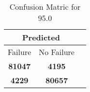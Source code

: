 \begin{table}[] 
\caption{Confusion Matric for 95.0} 
\label{Table: Prediction Accuracy-DMD95.0OnlySunEKF-ignoreReflection10.9EKF-top2-Reflection} 
\centering 
\begin{tabular} 
 {@{}ccc@{}} 
\toprule 
\multicolumn{2}{c}{\textbf{Predicted}}
 \\ \midrule 
\multicolumn{1}{|c|}{Failure} & 
\multicolumn{1}{c|}{No Failure}
 \\ \midrule 
\multicolumn{1}{|c|}{\color{green}\textbf{81047}} & 
\multicolumn{1}{c|}{\color{red}\textbf{4195}}
 \\ \midrule 
\multicolumn{1}{|c|}{\color{red}\textbf{4229}} & 
\multicolumn{1}{c|}{\color{green}\textbf{80657}}
 \\ \bottomrule 
\end{tabular} 
\end{table} 
